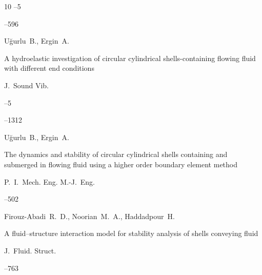 \begin{thebibliography}{10}
--5

--596






\by U\u{g}urlu~B., Ergin~A.

\paper A hydroelastic investigation of circular cylindrical shells-containing flowing fluid with different end conditions

\jour J.~Sound Vib.



--5

--1312








\by U\u{g}urlu~B., Ergin~A.

\paper The dynamics and stability of circular cylindrical shells containing and submerged in flowing fluid using a higher order boundary element method

\jour P.~I.~Mech. Eng. M.-J.~Eng.




--502






\by Firouz-Abadi~R.~D., Noorian~M.~A., Haddadpour~H.

\paper A fluid–structure interaction model for stability analysis of shells conveying fluid

\jour J.~Fluid. Struct.




--763






\end{thebibliography}
